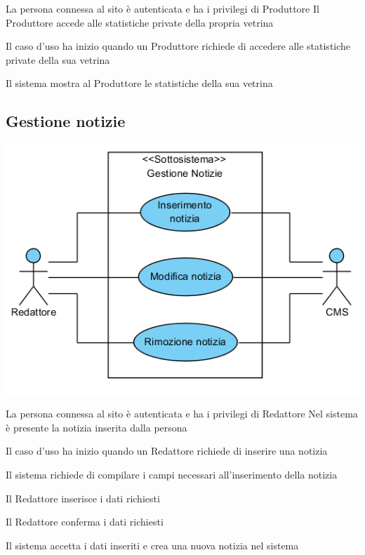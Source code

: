 \tabcuvspace

{}
{La persona connessa al sito è autenticata e ha i privilegi di Produttore}
{Il Produttore accede alle statistiche private della propria vetrina}
{\begin{enumCU}
		\item Il caso d'uso ha inizio quando un Produttore richiede di accedere alle statistiche private della sua vetrina
		\item Il sistema mostra al Produttore le statistiche della sua vetrina
	\end{enumCU}}


\subsection{Gestione notizie}
\begin{center}
   \includegraphics[width=\textwidth]{assets/visualParadigm/GestioneNotizie}
\end{center}
%
{}
{La persona connessa al sito è autenticata e ha i privilegi di Redattore}
{Nel  sistema è presente la notizia inserita dalla persona}
{\begin{enumCU}
	\item Il caso d'uso ha inizio quando un Redattore richiede di inserire una notizia  
	\item Il sistema richiede di compilare i campi necessari all'inserimento della notizia
	\item Il Redattore inserisce i dati richiesti \label{cuinsnot:2}
	\item Il Redattore conferma i dati richiesti
	\item Il sistema accetta i dati inseriti e crea una nuova notizia nel sistema
\end{enumCU}}
